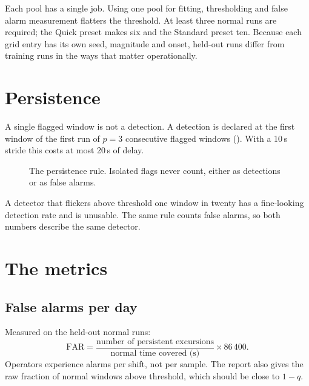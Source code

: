 Each pool has a single job. Using one pool for fitting, thresholding and false
alarm measurement flatters the threshold. At least three normal runs are
required; the Quick preset makes six and the Standard preset ten. Because each
grid entry has its own seed, magnitude and onset, held-out runs differ from
training runs in the ways that matter operationally.

\section{Persistence}

A single flagged window is not a detection. A detection is declared at the
first window of the first run of $p = 3$ consecutive flagged windows
(). With a 10\,s stride this costs at most 20\,s of delay.

\begin{figure}[htbp]
\centering
{}
\caption{The persistence rule. Isolated flags never count, either as
detections or as false alarms.}
\label{fig:persist}
\end{figure}

A detector that flickers above threshold one window in twenty has a
fine-looking detection rate and is unusable. The same rule counts false
alarms, so both numbers describe the same detector.

\section{The metrics}

\subsection{False alarms per day}
Measured on the held-out normal runs:
\begin{equation}
  \text{FAR} = \frac{\text{number of persistent excursions}}
                    {\text{normal time covered (s)}} \times 86\,400 .
\end{equation}
Operators experience alarms per shift, not per sample. The report also gives
the raw fraction of normal windows above threshold, which should be close to
$1-q$.

